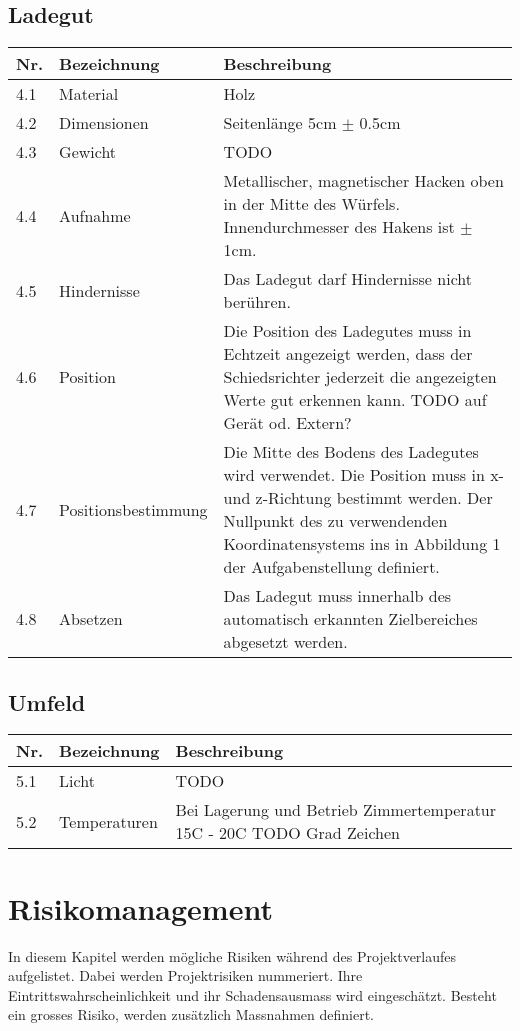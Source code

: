 \documentclass[a4paper]{report}
\begin{document}
\section{Ladegut}
\begin{tabular}{|l|l|l|}
	\hline 
	\textbf{Nr.} & \textbf{Bezeichnung} & \textbf{Beschreibung} \\
	\hline
	4.1 & Material & Holz \\
	\hline
	4.2 & Dimensionen & Seitenlänge 5cm $\pm$ 0.5cm \\
	\hline
	4.3 & Gewicht & TODO \\
	\hline
	4.4 & Aufnahme & Metallischer, magnetischer Hacken oben in der Mitte des Würfels. Innendurchmesser des Hakens ist $\pm$ 1cm. \\
	\hline
	4.5 & Hindernisse & Das Ladegut darf Hindernisse nicht berühren. \\
	\hline
	4.6 & Position & Die Position des Ladegutes muss in Echtzeit angezeigt werden, dass der Schiedsrichter jederzeit die angezeigten Werte gut erkennen kann. TODO auf Gerät od. Extern? \\
	\hline
	4.7 & Positionsbestimmung & Die Mitte des Bodens des Ladegutes wird verwendet. Die Position muss in x- und z-Richtung bestimmt werden. Der Nullpunkt des zu verwendenden Koordinatensystems ins in Abbildung 1 der Aufgabenstellung definiert. \\
	\hline
	4.8 & Absetzen & Das Ladegut muss innerhalb des automatisch erkannten Zielbereiches abgesetzt werden. \\
	\hline
\end{tabular}

\section{Umfeld}
\begin{tabular}{|l|l|l|}
	\hline 
	\textbf{Nr.} & \textbf{Bezeichnung} & \textbf{Beschreibung} \\
	\hline
	5.1 & Licht & TODO \\
	\hline
	5.2 & Temperaturen & Bei Lagerung und Betrieb Zimmertemperatur 15C - 20C TODO Grad Zeichen\\
	\hline
\end{tabular}

\chapter{Risikomanagement}
In diesem Kapitel werden mögliche Risiken während des Projektverlaufes aufgelistet. Dabei werden Projektrisiken nummeriert. Ihre Eintrittswahrscheinlichkeit und ihr Schadensausmass wird eingeschätzt. Besteht ein grosses Risiko, werden zusätzlich Massnahmen definiert. 
\end{document}
